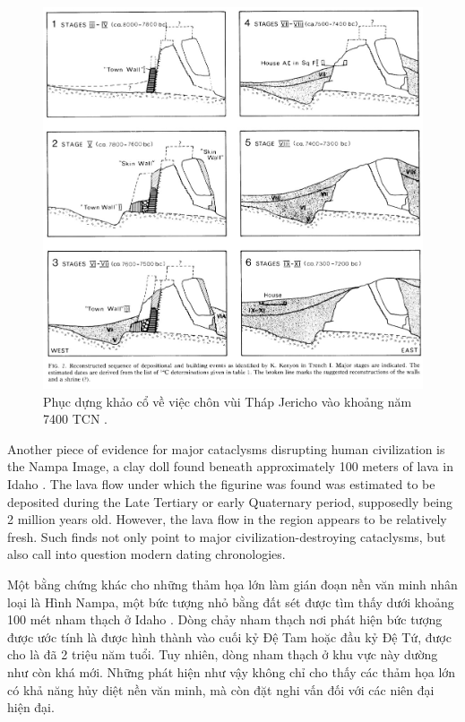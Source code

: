 \documentclass[10pt,twocolumn,letterpaper]{article}
\begin{document}
\begin{figure}[t]
\begin{center}
   \includegraphics[width=1\linewidth]{jericho.jpg}
\end{center}
   \caption{Phục dựng khảo cổ về việc chôn vùi Tháp Jericho vào khoảng năm 7400 TCN \cite{95}.}
\label{fig:14}
\label{fig:onecol}
\end{figure}
Another piece of evidence for major cataclysms disrupting human civilization is the Nampa Image, a clay doll found beneath approximately 100 meters of lava in Idaho \cite{102,103}. The lava flow under which the figurine was found was estimated to be deposited during the Late Tertiary or early Quaternary period, supposedly being 2 million years old. However, the lava flow in the region appears to be relatively fresh. Such finds not only point to major civilization-destroying cataclysms, but also call into question modern dating chronologies.

Một bằng chứng khác cho những thảm họa lớn làm gián đoạn nền văn minh nhân loại là Hình Nampa, một bức tượng nhỏ bằng đất sét được tìm thấy dưới khoảng 100 mét nham thạch ở Idaho \cite{102,103}. Dòng chảy nham thạch nơi phát hiện bức tượng được ước tính là được hình thành vào cuối kỷ Đệ Tam hoặc đầu kỷ Đệ Tứ, được cho là đã 2 triệu năm tuổi. Tuy nhiên, dòng nham thạch ở khu vực này dường như còn khá mới. Những phát hiện như vậy không chỉ cho thấy các thảm họa lớn có khả năng hủy diệt nền văn minh, mà còn đặt nghi vấn đối với các niên đại hiện đại.
\end{document}
